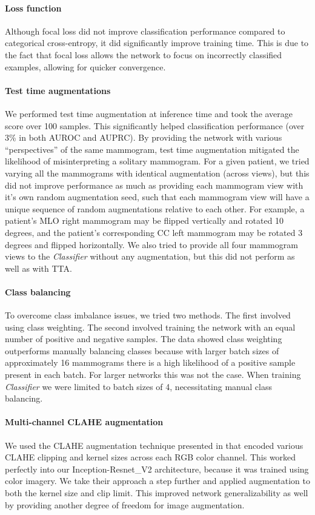 \documentclass[journal]{IEEEtran}
\begin{document}
\paragraph{Loss function} Although focal loss \cite{focalloss-2017} did not improve classification performance compared to categorical cross-entropy, it did significantly improve training time.  This is due to the fact that focal loss allows the network to focus on incorrectly classified examples, allowing for quicker convergence.
\paragraph{Test time augmentations} We performed test time augmentation at inference time and took the average score over 100 samples.  This significantly helped classification performance (over 3\% in both AUROC and AUPRC). By providing the network with various ``perspectives'' of the same mammogram, test time augmentation mitigated the likelihood of misinterpreting a solitary mammogram.  For a given patient, we tried varying all the mammograms with identical augmentation (across views), but this did not improve performance as much as providing each mammogram view with it's own random augmentation seed, such that each mammogram view will have a unique sequence of random augmentations relative to each other.  For example, a patient's MLO right mammogram may be flipped vertically and rotated 10 degrees, and the patient's corresponding CC left mammogram may be rotated 3 degrees and flipped horizontally.  We also tried to provide all four mammogram views to the \textit{Classifier} without any augmentation, but this did not perform as well as with TTA.
\paragraph{Class balancing} To overcome class imbalance issues, we tried two methods.  The first involved using class weighting.  The second involved training the network with an equal number of positive and negative samples.  The data showed class weighting outperforms manually balancing classes because with larger batch sizes of approximately 16 mammograms there is a high likelihood of a positive sample present in each batch.  For larger networks this was not the case.  When training \textit{Classifier} we were limited to batch sizes of 4, necessitating manual class balancing.
\paragraph{Multi-channel CLAHE augmentation} We used the CLAHE augmentation technique presented in \cite{teare-2017} that encoded various CLAHE clipping and kernel sizes across each RGB color channel.  This worked perfectly into our Inception-Resnet\_V2 architecture, because it was trained using color imagery.  We take their approach a step further and applied augmentation to both the kernel size and clip limit.  This improved network generalizability as well by providing another degree of freedom for image augmentation.  
\end{document}
